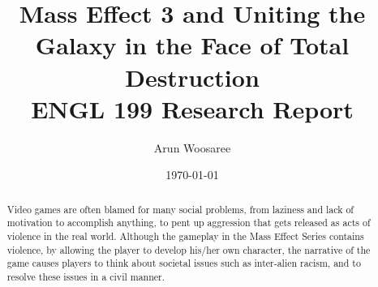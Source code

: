\documentclass[journal]{IEEEtran}
\title{Mass Effect 3 and Uniting the Galaxy in the Face of Total Destruction\\
\vspace{.25cm}\large ENGL 199 Research Report \vspace{-.5cm}}
\author{\LARGE Arun Woosaree}
\date{\today}
\begin{document}
\maketitle %

\begin{abstract}
 Video games are often blamed for many social problems, from laziness and lack of motivation to accomplish anything, to pent up aggression that gets released as acts of violence in the real world. Although the gameplay in the Mass Effect Series contains violence, by allowing the player to develop his/her own character, the narrative of the game causes players to think about societal issues such as inter-alien racism, and to resolve these issues in a civil manner.
\end{abstract}

\end{document}
